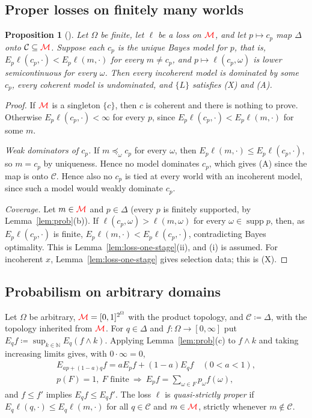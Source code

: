 \documentclass[11pt]{article}
\newcommand{\chg}[1]{{\color{red}#1}}
\newtheorem{proposition}[theorem]{Proposition}
\theoremstyle{definition}
\theoremstyle{remark}
\newcommand{\M}{\mathcal M}
\newcommand{\C}{\mathcal C}
\newcommand{\supp}{\operatorname{supp}}
\begin{document}
\subsection{Proper losses on finitely many worlds}

\begin{proposition}[{\cite{Predd2009,Pettigrew2022}}]\label{prop:proper}
Let $\Omega$ be finite, let $\ell$ be a loss on $\chg{\M}$, and let $p\mapsto c_p$ map $\Delta$ onto $\C\subseteq\chg{\M}$. Suppose each $c_p$ is the unique Bayes model for $p$, that is, $E_p\ell(c_p,\cdot)<E_p\ell(m,\cdot)$ for every $m\ne c_p$, and $p\mapsto\ell(c_p,\omega)$ is lower semicontinuous for every $\omega$. Then every incoherent model is dominated by some $c_p$, every coherent model is undominated, and $\{L\}$ satisfies \chg{(X) and (A)}.
\end{proposition}
\begin{proof}
If $\chg{\M}$ is a singleton $\{c\}$, then $c$ is coherent and there is nothing to prove. Otherwise $E_p\ell(c_p,\cdot)<\infty$ for every $p$, since $E_p\ell(c_p,\cdot)<E_p\ell(m,\cdot)$ for some $m$.

\emph{Weak dominators of $c_p$.} If $m\preceq_\omega c_p$ for every $\omega$, then $E_p\ell(m,\cdot)\le E_p\ell(c_p,\cdot)$, so $m=c_p$ by uniqueness. Hence no model dominates $c_p$, which gives (A) since the map is onto $\C$. Hence also no $c_p$ is tied at every world with an incoherent model, since such a model would weakly dominate $c_p$.

\emph{Coverage.} Let $m\in\chg{\M}$ and $p\in\Delta$ (every $p$ is finitely supported, by Lemma~\ref{lem:prob}(b)). If $\ell(c_p,\omega)>\ell(m,\omega)$ for every $\omega\in\supp p$, then, as $E_p\ell(c_p,\cdot)$ is finite, $E_p\ell(m,\cdot)<E_p\ell(c_p,\cdot)$, contradicting Bayes optimality. This is Lemma~\ref{lem:loss-one-stage}(ii), and (i) is assumed. For incoherent $x$, Lemma~\ref{lem:loss-one-stage} gives selection data; this is (X).
\end{proof}

\subsection{Probabilism on arbitrary domains}

Let $\Omega$ be arbitrary, $\chg{\M}=[0,1]^{2^\Omega}$ with the product topology, and $\C\coloneqq\Delta$, with the topology inherited from $\chg{\M}$. For $q\in\Delta$ and $f:\Omega\to[0,\infty]$ put $E_qf\coloneqq\sup_{k\in\mathbb N}E_q(f\wedge k)$. Applying Lemma~\ref{lem:prob}(c) to $f\wedge k$ and taking increasing limits gives, with $0\cdot\infty=0$,
\begin{gather*}
E_{ap+(1-a)q}f=aE_pf+(1-a)E_qf\quad(0<a<1),\\
p(F)=1,\ F\text{ finite}\ \Longrightarrow\ E_pf=\textstyle\sum_{\omega\in F}p_\omega f(\omega),
\end{gather*}
and $f\le f'$ implies $E_qf\le E_qf'$. The loss $\ell$ is \emph{quasi-strictly proper} if $E_q\ell(q,\cdot)\le E_q\ell(m,\cdot)$ for all $q\in\C$ and $m\in\chg{\M}$, strictly whenever $m\notin\C$.
\end{document}
